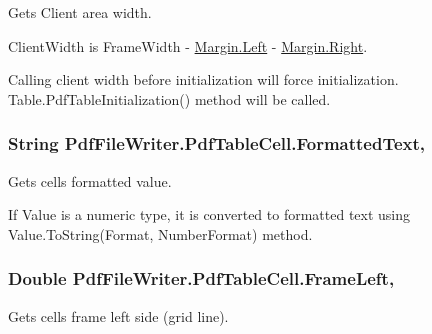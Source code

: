 Gets Client area width. 

Client\+Width is Frame\+Width -\/ \hyperlink{namespace_pdf_file_writer_a3991bfacc8c7be240452dd24ec817157a945d5e233cf7d6240f6b783b36a374ff}{Margin.\+Left} -\/ \hyperlink{namespace_pdf_file_writer_a3991bfacc8c7be240452dd24ec817157a92b09c7c48c520c3c55e497875da437c}{Margin.\+Right}. 

Calling client width before initialization will force initialization. Table.\+Pdf\+Table\+Initialization() method will be called. 
\subsubsection[{\texorpdfstring{Formatted\+Text}{FormattedText}}]{\setlength{\rightskip}{0pt plus 5cm}String Pdf\+File\+Writer.\+Pdf\+Table\+Cell.\+Formatted\+Text\hspace{0.3cm}{\ttfamily [get]}, {\ttfamily [set]}}\hypertarget{class_pdf_file_writer_1_1_pdf_table_cell_a3b5c8c5ce7f712cd36ef121752abfe34}{}\label{class_pdf_file_writer_1_1_pdf_table_cell_a3b5c8c5ce7f712cd36ef121752abfe34}


Gets cell\textquotesingle{}s formatted value. 

If Value is a numeric type, it is converted to formatted text using Value.\+To\+String(\+Format, Number\+Format) method. 
\subsubsection[{\texorpdfstring{Frame\+Left}{FrameLeft}}]{\setlength{\rightskip}{0pt plus 5cm}Double Pdf\+File\+Writer.\+Pdf\+Table\+Cell.\+Frame\+Left\hspace{0.3cm}{\ttfamily [get]}, {\ttfamily [set]}}\hypertarget{class_pdf_file_writer_1_1_pdf_table_cell_a1b7a9752e2f996c520641d5649ad4026}{}\label{class_pdf_file_writer_1_1_pdf_table_cell_a1b7a9752e2f996c520641d5649ad4026}


Gets cell\textquotesingle{}s frame left side (grid line). 

